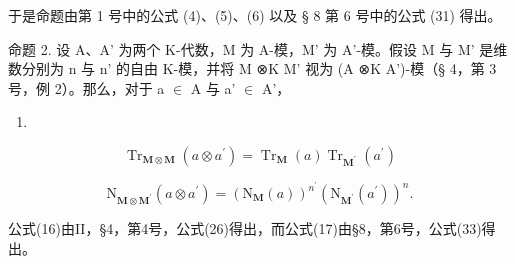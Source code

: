 于是命题由第 1 号中的公式 (4)、(5)、(6) 以及 § 8 第 6 号中的公式 (31) 得出。

命题 2. 设 A、A' 为两个 K-代数，M 为 A-模，M' 为 A'-模。假设 M 与 M' 是维数分别为 n 与 n' 的自由 K-模，并将 M ⊗K M' 视为 (A ⊗K A')-模（§ 4，第 3 号，例 2）。那么，对于 a \ensuremath{\in} A 与 a' \ensuremath{\in} A'，

\begin{enumerate}
\def\labelenumi{(\arabic{enumi})}
\setcounter{enumi}{15}
\tightlist
\item
\end{enumerate}

\[
\operatorname{Tr} _ {\mathbf {M} \otimes \mathbf {M}} (a \otimes a ^ {\prime}) = \operatorname{Tr} _ {\mathbf {M}} (a) \operatorname{Tr} _ {\mathbf {M} ^ {\prime}} (a ^ {\prime})\tag{17}
\]

\[
\mathrm{N} _ {\mathbf {M} \otimes \mathbf {M} ^ {\prime}} (a \otimes a ^ {\prime}) = (\mathrm{N} _ {\mathbf {M}} (a)) ^ {n ^ {\prime}} (\mathrm{N} _ {\mathbf {M} ^ {\prime}} (a ^ {\prime})) ^ {n}.
\]

公式(16)由II，§4，第4号，公式(26)得出，而公式(17)由§8，第6号，公式(33)得出。

